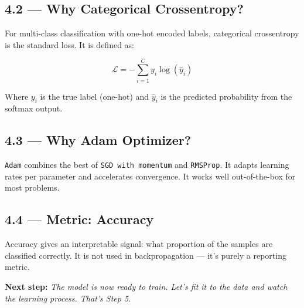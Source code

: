 \documentclass[11pt]{article}
\begin{document}
\subsection*{\textbf{4.2 — Why Categorical Crossentropy?}}

For multi-class classification with one-hot encoded labels, categorical crossentropy is the standard loss. It is defined as:

\[
\mathcal{L} = -\sum_{i=1}^{C} y_i \log(\hat{y}_i)
\]

Where $y_i$ is the true label (one-hot) and $\hat{y}_i$ is the predicted probability from the softmax output.

\subsection*{\textbf{4.3 — Why Adam Optimizer?}}

\texttt{Adam} combines the best of \texttt{SGD with momentum} and \texttt{RMSProp}. It adapts learning rates per parameter and accelerates convergence. It works well out-of-the-box for most problems.

\subsection*{\textbf{4.4 — Metric: Accuracy}}

Accuracy gives an interpretable signal: what proportion of the samples are classified correctly. It is not used in backpropagation — it's purely a reporting metric.

\vspace{2em}
\noindent\textbf{\Large Next step:} \textit{The model is now ready to train. Let's fit it to the data and watch the learning process. That’s Step 5.}
\end{document}

